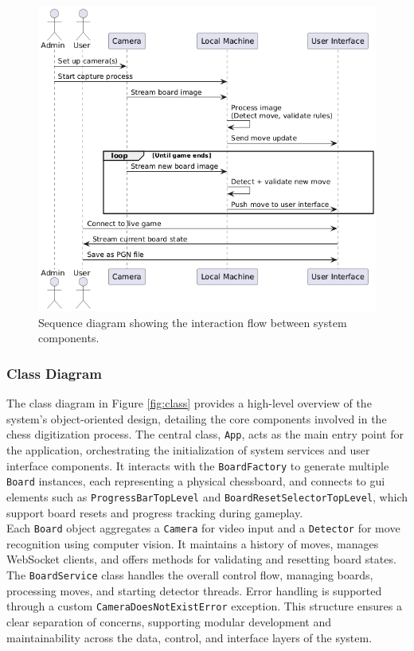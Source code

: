 \begin{figure}[h!]
    \centering
    \includegraphics[width=0.75\linewidth]{figures/results/uml/sequence.png}
    \caption[Sequence diagram]{Sequence diagram showing the interaction flow between system components.}
    \label{fig:sequence}
\end{figure}

\newpage

\subsubsection*{Class Diagram}

The class diagram in Figure \ref{fig:class} provides a high-level overview of the system’s object-oriented design, detailing the core components involved in the chess digitization process. The central class, \texttt{App}, acts as the main entry point for the application, orchestrating the initialization of system services and user interface components. It interacts with the \texttt{BoardFactory} to generate multiple \texttt{Board} instances, each representing a physical chessboard, and connects to \gls{gui} elements such as \texttt{ProgressBarTopLevel} and \texttt{BoardResetSelectorTopLevel}, which support board resets and progress tracking during gameplay. \\

Each \texttt{Board} object aggregates a \texttt{Camera} for video input and a \texttt{Detector} for move recognition using computer vision. It maintains a history of moves, manages WebSocket clients, and offers methods for validating and resetting board states. The \texttt{BoardService} class handles the overall control flow, managing boards, processing moves, and starting detector threads. Error handling is supported through a custom \texttt{CameraDoesNotExistError} exception. This structure ensures a clear separation of concerns, supporting modular development and maintainability across the data, control, and interface layers of the system.

